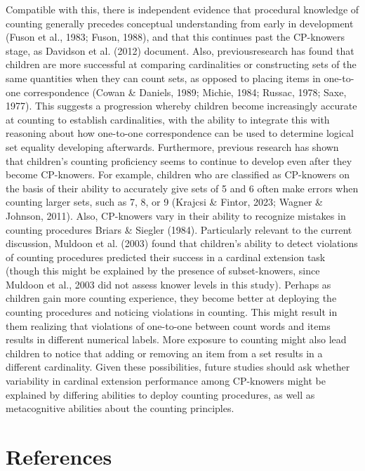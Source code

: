 \documentclass[
  man,floatsintext]{apa7}
\begin{document}
Compatible with this, there is independent evidence that procedural knowledge of counting generally precedes conceptual understanding from early in development (Fuson et al., 1983; Fuson, 1988), and that this continues past the CP-knowers stage, as Davidson et al. (2012) document. Also, previousresearch has found that children are more successful at comparing cardinalities or constructing sets of the same quantities when they can count sets, as opposed to placing items in one-to-one correspondence (Cowan \& Daniels, 1989; Michie, 1984; Russac, 1978; Saxe, 1977). This suggests a progression whereby children become increasingly accurate at counting to establish cardinalities, with the ability to integrate this with reasoning about how one-to-one correspondence can be used to determine logical set equality developing afterwards. Furthermore, previous research has shown that children's counting proficiency seems to continue to develop even after they become CP-knowers. For example, children who are classified as CP-knowers on the basis of their ability to accurately give sets of 5 and 6 often make errors when counting larger sets, such as 7, 8, or 9 (Krajcsi \& Fintor, 2023; Wagner \& Johnson, 2011).
Also, CP-knowers vary in their ability to recognize mistakes in counting procedures Briars \& Siegler (1984). Particularly relevant to the current discussion, Muldoon et al. (2003) found that children's ability to detect violations of counting procedures predicted their success in a cardinal extension task (though this might be explained by the presence of subset-knowers, since Muldoon et al., 2003 did not assess knower levels in this study). Perhaps as children gain more counting experience, they become better at deploying the counting procedures and noticing violations in counting. This might result in them realizing that violations of one-to-one between count words and items results in different numerical labels. More exposure to counting might also lead children to notice that adding or removing an item from a set results in a different cardinality. Given these possibilities, future studies should ask whether variability in cardinal extension performance among CP-knowers might be explained by differing abilities to deploy counting procedures, as well as metacognitive abilities about the counting principles.

\newpage

\section{References}\label{references}
\end{document}
